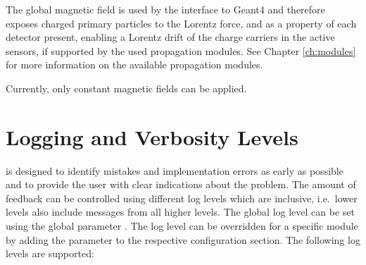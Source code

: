 The global magnetic field is used by the interface to Geant4 and therefore exposes charged primary particles to the Lorentz force, and as a property of each detector present, enabling a Lorentz drift of the charge carriers in the active sensors, if supported by the used propagation modules. See Chapter \ref{ch:modules} for more information on the available propagation modules.

Currently, only constant magnetic fields can be applied.

\section{Logging and Verbosity Levels}
\label{sec:logging_verbosity}
\apsq is designed to identify mistakes and implementation errors as early as possible and to provide the user with clear indications about the problem.
The amount of feedback can be controlled using different log levels which are inclusive, i.e.\ lower levels also include messages from all higher levels.
The global log level can be set using the global parameter .
The log level can be overridden for a specific module by adding the  parameter to the respective configuration section.
The following log levels are supported:
